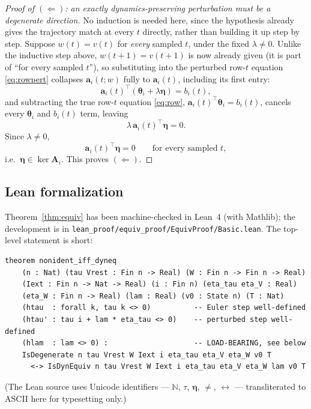 \documentclass[11pt]{article}
\newcommand{\Mat}[1]{\mathbf{#1}}
\newcommand{\A}{\Mat{A}}
\newcommand{\thet}{\boldsymbol{\theta}}
\begin{document}
\begin{proof}[Proof of $(\Leftarrow)$: an exactly dynamics-preserving
perturbation must be a degenerate direction]

No induction is needed here, since the hypothesis already gives the
trajectory match at every $t$ directly, rather than building it up step by
step. Suppose $w(t)=v(t)$ for \emph{every} sampled $t$, under the fixed
$\lambda\neq 0$. Unlike the inductive step above, $w(t{+}1)=v(t{+}1)$ is now
already given (it is part of ``for every sampled $t$''), so substituting into
the perturbed row-$t$ equation \eqref{eq:rowpert} collapses $\Mat a_i(t;w)$
fully to $\Mat a_i(t)$, including its first entry:
\begin{equation}
\Mat a_i(t)^{\!\top}(\thet_i+\lambda\boldsymbol\eta) = b_i(t) ,
\label{eq:conv-sub}
\end{equation}
and subtracting the true row-$t$ equation \eqref{eq:row},
$\Mat a_i(t)^{\!\top}\thet_i=b_i(t)$, cancels every $\thet_i$ and $b_i(t)$ term,
leaving
\begin{equation}
\lambda\,\Mat a_i(t)^{\!\top}\boldsymbol\eta = 0 .
\label{eq:conv-diff}
\end{equation}
Since $\lambda\neq 0$,
\begin{equation}
\Mat a_i(t)^{\!\top}\boldsymbol\eta = 0 \qquad \text{for every sampled } t,
\label{eq:conv-concl}
\end{equation}
i.e.\ $\boldsymbol\eta\in\ker\A_i$. This proves $(\Leftarrow)$.
\end{proof}

\subsection{Lean formalization}
\label{sec:lean}

Theorem~\ref{thm:equiv} has been machine-checked in Lean~4 (with Mathlib);
the development is in \texttt{lean\_proof/equiv\_proof/EquivProof/Basic.lean}.
The top-level statement is short:
\begin{verbatim}
theorem nonident_iff_dyneq
    (n : Nat) (tau Vrest : Fin n -> Real) (W : Fin n -> Fin n -> Real)
    (Iext : Fin n -> Nat -> Real) (i : Fin n) (eta_tau eta_V : Real)
    (eta_W : Fin n -> Real) (lam : Real) (v0 : State n) (T : Nat)
    (htau  : forall k, tau k <> 0)          -- Euler step well-defined
    (htau' : tau i + lam * eta_tau <> 0)    -- perturbed step well-defined
    (hlam  : lam <> 0) :                    -- LOAD-BEARING, see below
    IsDegenerate n tau Vrest W Iext i eta_tau eta_V eta_W v0 T
      <-> IsDynEquiv n tau Vrest W Iext i eta_tau eta_V eta_W lam v0 T
\end{verbatim}
(The Lean source uses Unicode identifiers --- $\mathbb N$, $\tau$,
$\boldsymbol\eta$, $\neq$, $\leftrightarrow$ --- transliterated to ASCII
here for typesetting only.)
\end{document}
